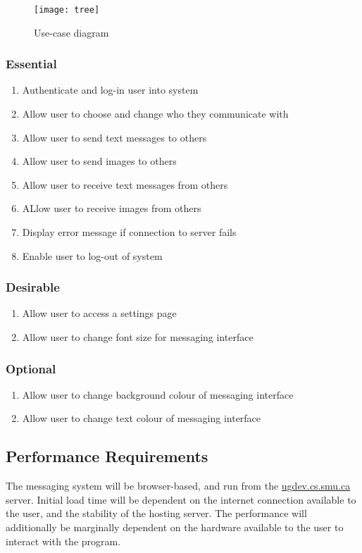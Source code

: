 \documentclass[11pt]{article}
\begin{document}
\begin{figure}[!htb]
  \texttt{[image: tree]}
  \caption{Use-case diagram}
\end{figure}

\subsubsection{Essential}
\begin{enumerate}
    \item Authenticate and log-in user into system
    \item Allow user to choose and change who they communicate with
    \item Allow user to send text messages to others
    \item Allow user to send images to others
    \item Allow user to receive text messages from others
    \item ALlow user to receive images from others
    \item Display error message if connection to server fails
    \item Enable user to log-out of system
\end{enumerate}

\subsubsection{Desirable}
\begin{enumerate}
    \item Allow user to access a settings page
    \item Allow user to change font size for messaging interface
\end{enumerate}

\subsubsection{Optional}
\begin{enumerate}
    \item Allow user to change background colour of messaging interface
    \item Allow user to change text colour of messaging interface
\end{enumerate}

\subsection{Performance Requirements}
The messaging system will be browser-based, and run from the \url{ugdev.cs.smu.ca} server. Initial
load time will be dependent on the internet connection available to the user, and the stability of
the hosting server. The performance will additionally be marginally dependent on the hardware
available to the user to interact with the program.
\end{document}
